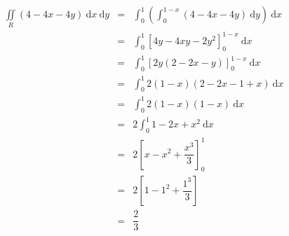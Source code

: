 \documentclass[a4paper]{article}
\begin{document}
	\begin{equation*}
		\begin{array}{rcl}
			\displaystyle\iint \limits_{R} \left(4 - 4x - 4y\right) \:\mathrm{d}x \:\mathrm{d}y 
			&=& 
			\displaystyle \int_{0}^{1} \left(\int_{0}^{1-x} \left(4-4x-4y\right) \:\mathrm{d}y\right) \:\mathrm{d}x \\ [1.5em]
			&=&
			\displaystyle \int_{0}^{1} \left[4y - 4xy - 2y^{2}\right]_{0}^{1-x} \:\mathrm{d}x \\ [1.5em]
			&=&
			\displaystyle \int_{0}^{1} \left[2y\left(2 - 2x - y\right)\right]_{0}^{1-x} \:\mathrm{d}x \\ [1.5em]
			&=&
			\displaystyle \int_{0}^{1} 2 \left(1-x\right) \left(2 - 2x -1 +x\right) \:\mathrm{d}x \\ [1.5em]
			&=&
			\displaystyle \int_{0}^{1} 2 \left(1-x\right) \left(1 - x\right) \:\mathrm{d}x \\ [1.5em]
			&=&
			\displaystyle 2 \int_{0}^{1} 1 - 2x + x^{2} \:\mathrm{d}x \\ [1.5em]
			&=&
			\displaystyle 2 \left[x - x^{2} + \dfrac{x^{3}}{3}\right]_{0}^{1} \\ [1.5em]
			&=&
			\displaystyle 2 \left[1 - 1^{2} + \dfrac{1^{3}}{3}\right] \\ [1.5em]
			&=&
			\dfrac{2}{3}
		\end{array}
	\end{equation*}

	\newpage
\end{document}
